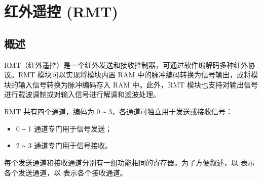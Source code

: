 \documentclass[main\_\_CN.tex]{subfiles}
\begin{document}

\ifglobal
\else
    {\let\clearpage\relax \listoftodos}
    {\let\clearpage\relax \listofdonetodos}
    \tableofcontents
\fi



\hypertarget{rmt}{}
\chapter{红外遥控 (RMT)}
\label{mod:rmt}

\section{概述}
RMT（红外遥控）是一个红外发送和接收控制器，可通过软件编解码多种红外协议。RMT 模块可以实现将模块内置 RAM 中的脉冲编码转换为信号输出，或将模块的输入信号转换为脉冲编码存入 RAM 中。此外，RMT 模块也支持对输出信号进行载波调制或对输入信号进行解调和滤波处理。

RMT 共有四个通道，编码为 0 \verb+~+ 3，各通道可独立用于发送或接收信号：
\begin{itemize}
\item 0 \verb+~+ 1 通道专门用于信号发送；
\item 2 \verb+~+ 3 通道专门用于信号接收。
\end{itemize}
每个发送通道和接收通道分别有一组功能相同的寄存器。为了方便叙述，以  表示各个发送通道，以  表示各个接收通道。
\end{document}

